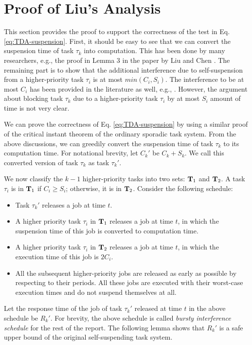 
\section{Proof of Liu's Analysis}  

This section provides the proof to support the correctness of the test in Eq. \eqref{eq:TDA-suspension}. First, it should be easy to see that we can convert the suspension time of task $\tau_k$ into computation. This has been done by many researchers, e.g., the proof in Lemma 3 in the paper by Liu and Chen \cite{Liu_2014}. The remaining part is to show that the additional interference due to self-suspension from a higher-priority task $\tau_i$ is at most $min(C_i, S_i)$. The interference to be at most $C_i$ has been provided in the literature as well, e.g., \cite{Rajkumar_1990}\cite{Liu_2014}. However, the argument about blocking task $\tau_k$ due to a higher-priority task $\tau_i$ by at most $S_i$ amount of time is not very clear. 

We can prove the correctness of Eq. \eqref{eq:TDA-suspension} by using a similar proof of the critical instant theorem of the ordinary sporadic task system. From the above discussions, we can greedily convert the suspension time of task $\tau_k$ to its computation time. For notational brevity, let $C_k'$ be $C_k + S_k$. We call this converted version of task $\tau_k$ as task $\tau_k'$. 

We now classify the $k-1$ higher-priority tasks into two sets: ${\bf T}_1$ and ${\bf T}_2$. A task $\tau_i$ is in ${\bf T}_1$ if $C_i \geq S_i$; otherwise, it is in ${\bf T}_2$.
Consider the following schedule:
\begin{itemize}
\item Task $\tau_k'$ releases a job at time $t$.
\item A higher priority task $\tau_i$ in ${\bf T}_1$ releases a job at time $t$, in which the suspension time of this job is converted to computation time.
\item A higher priority task $\tau_i$ in ${\bf T}_2$ releases a job at time $t$, in which the execution time of this job is $2C_i$.
\item All the subsequent higher-priority jobs are released as early as possible by respecting to their periods. All these jobs are executed with their worst-case execution times and do not suspend themselves at all.
\end{itemize}

Let the response time of the job of task $\tau_k'$ released at time $t$ in the above schedule be $R_k'$. For brevity, the above schedule is called \emph{bursty interference schedule} for the rest of the report. The following lemma shows that $R_k'$ is a safe upper bound of the original self-suspending task system. 

